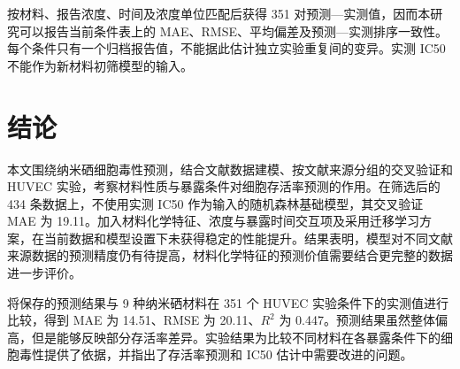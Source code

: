 \documentclass[letterpaper]{article}
\begin{document}
按材料、报告浓度、时间及浓度单位匹配后获得 351 对预测—实测值，因而本研究可以报告当前条件表上的 MAE、RMSE、平均偏差及预测—实测排序一致性。每个条件只有一个归档报告值，不能据此估计独立实验重复间的变异。实测 IC50 不能作为新材料初筛模型的输入。

\section{结论}








本文围绕纳米硒细胞毒性预测，结合文献数据建模、按文献来源分组的交叉验证和 HUVEC 实验，考察材料性质与暴露条件对细胞存活率预测的作用。在筛选后的 434 条数据上，不使用实测 IC50 作为输入的随机森林基础模型，其交叉验证 MAE 为 19.11。加入材料化学特征、浓度与暴露时间交互项及采用迁移学习方案，在当前数据和模型设置下未获得稳定的性能提升。结果表明，模型对不同文献来源数据的预测精度仍有待提高，材料化学特征的预测价值需要结合更完整的数据进一步评价。

将保存的预测结果与 9 种纳米硒材料在 351 个 HUVEC 实验条件下的实测值进行比较，得到 MAE 为 14.51、RMSE 为 20.11、$R^2$ 为 0.447。预测结果虽然整体偏高，但是能够反映部分存活率差异。实验结果为比较不同材料在各暴露条件下的细胞毒性提供了依据，并指出了存活率预测和 IC50 估计中需要改进的问题。
\end{document}
